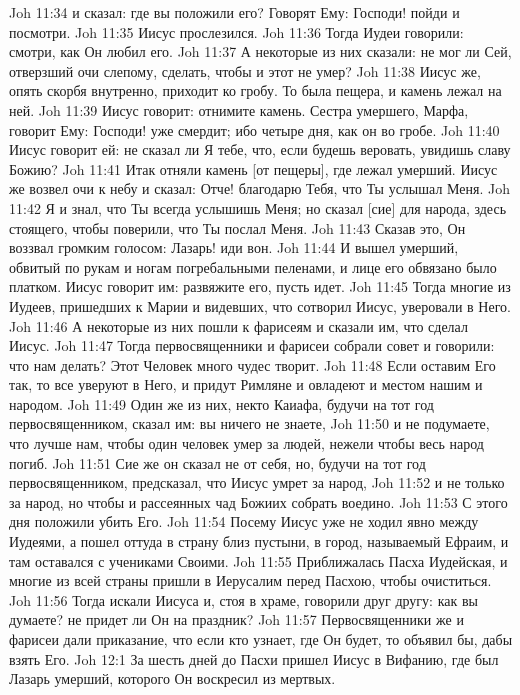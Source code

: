 Joh 11:34  и сказал: где вы положили его? Говорят Ему: Господи! пойди и посмотри.
Joh 11:35  Иисус прослезился.
Joh 11:36  Тогда Иудеи говорили: смотри, как Он любил его.
Joh 11:37  А некоторые из них сказали: не мог ли Сей, отверзший очи слепому, сделать, чтобы и этот не умер?
Joh 11:38  Иисус же, опять скорбя внутренно, приходит ко гробу. То была пещера, и камень лежал на ней.
Joh 11:39  Иисус говорит: отнимите камень. Сестра умершего, Марфа, говорит Ему: Господи! уже смердит; ибо четыре дня, как он во гробе.
Joh 11:40  Иисус говорит ей: не сказал ли Я тебе, что, если будешь веровать, увидишь славу Божию?
Joh 11:41  Итак отняли камень [от пещеры], где лежал умерший. Иисус же возвел очи к небу и сказал: Отче! благодарю Тебя, что Ты услышал Меня.
Joh 11:42  Я и знал, что Ты всегда услышишь Меня; но сказал [сие] для народа, здесь стоящего, чтобы поверили, что Ты послал Меня.
Joh 11:43  Сказав это, Он воззвал громким голосом: Лазарь! иди вон.
Joh 11:44  И вышел умерший, обвитый по рукам и ногам погребальными пеленами, и лице его обвязано было платком. Иисус говорит им: развяжите его, пусть идет.
Joh 11:45  Тогда многие из Иудеев, пришедших к Марии и видевших, что сотворил Иисус, уверовали в Него.
Joh 11:46  А некоторые из них пошли к фарисеям и сказали им, что сделал Иисус.
Joh 11:47  Тогда первосвященники и фарисеи собрали совет и говорили: что нам делать? Этот Человек много чудес творит.
Joh 11:48  Если оставим Его так, то все уверуют в Него, и придут Римляне и овладеют и местом нашим и народом.
Joh 11:49  Один же из них, некто Каиафа, будучи на тот год первосвященником, сказал им: вы ничего не знаете,
Joh 11:50  и не подумаете, что лучше нам, чтобы один человек умер за людей, нежели чтобы весь народ погиб.
Joh 11:51  Сие же он сказал не от себя, но, будучи на тот год первосвященником, предсказал, что Иисус умрет за народ,
Joh 11:52  и не только за народ, но чтобы и рассеянных чад Божиих собрать воедино.
Joh 11:53  С этого дня положили убить Его.
Joh 11:54  Посему Иисус уже не ходил явно между Иудеями, а пошел оттуда в страну близ пустыни, в город, называемый Ефраим, и там оставался с учениками Своими.
Joh 11:55  Приближалась Пасха Иудейская, и многие из всей страны пришли в Иерусалим перед Пасхою, чтобы очиститься.
Joh 11:56  Тогда искали Иисуса и, стоя в храме, говорили друг другу: как вы думаете? не придет ли Он на праздник?
Joh 11:57  Первосвященники же и фарисеи дали приказание, что если кто узнает, где Он будет, то объявил бы, дабы взять Его.
Joh 12:1  За шесть дней до Пасхи пришел Иисус в Вифанию, где был Лазарь умерший, которого Он воскресил из мертвых.
